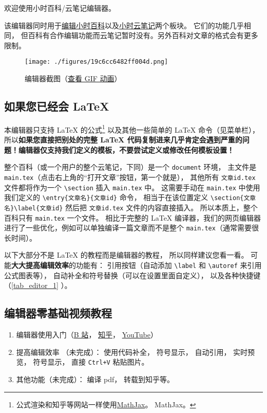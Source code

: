 
欢迎使用小时百科/云笔记编辑器。

该编辑器同时用于\href{https://wuli.wiki/editor/}{编辑小时百科}以及\href{https://wuli.wiki/note/}{小时云笔记}两个板块。 它们的功能几乎相同， 但百科有合作编辑功能而云笔记暂时没有。另外百科对文章的格式会有更多限制。
\begin{figure}[ht]
\centering
\texttt{[image: ./figures/19c6cc6482ff004d.png]}
\caption{编辑器截图（\href{https://wuli.wiki/apps/editor.gif}{查看 GIF 动画}）} \label{fig_editor_3}
\end{figure}

\subsection{如果您已经会 LaTeX}
本编辑器只支持 LaTeX 的公式\footnote{公式渲染和知乎等网站一样使用\href{https://www.mathjax.org/}{MathJax}。 MathJax。} 以及其他一些简单的 LaTeX 命令（见菜单栏）， 所以\textbf{如果您直接把别处的完整 LaTeX 代码复制进来几乎肯定会遇到严重的问题！编辑器仅支持我们定义的模板，不要尝试定义或修改任何模板设置！}

整个百科（或一个用户的整个云笔记，下同）是一个 \verb|document| 环境， 主文件是 \verb|main.tex|（点击右上角的“打开文章”按钮，第一个就是）， 其他所有 \verb|文章id.tex| 文件都将作为一个 \verb|\section| 插入 \verb|main.tex| 中。 这需要手动在 \verb|main.tex| 中使用我们定义的 \verb|\entry{文章名}{文章id}| 命令， 相当于在该位置定义 \verb|\section{文章名}\label{文章id}| 然后把 \verb|文章id.tex| 文件的内容直接插入。 所以本质上，整个百科只有 \verb|main.tex| 一个文件。 相比于完整的 LaTeX 编译器，我们的网页编辑器进行了一些优化，例如可以单独编译一篇文章而不是整个 \verb`main.tex`（通常需要很长时间）。

以下大部分不是 LaTeX 的教程而是编辑器的教程， 所以同样建议您看一看。 可能\textbf{大大提高编辑效率}的功能有： 引用按钮（自动添加 \verb|\label| 和 \verb|\autoref| 来引用公式图表等）， 自动补全和符号替换（可以在设置里面自定义）， 以及各种快捷键（\autoref{tab_editor_1} ）。


\subsection{编辑器零基础视频教程}
\begin{enumerate}
\item 编辑器使用入门（\href{https://www.bilibili.com/video/av87698355/}{B 站}， \href{https://zhuanlan.zhihu.com/p/105869878}{知乎}， \href{https://www.youtube.com/watch?v=AN2tXNanD9U&t=1s}{YouTube}）
\item 提高编辑效率 （未完成）： 使用代码补全， 符号显示， 自动引用， 实时预览， 符号显示， 直接 \verb`Ctrl+V` 粘贴图片。
\item 其他功能（未完成）： 编译 pdf， 转载到知乎等。
\end{enumerate}


